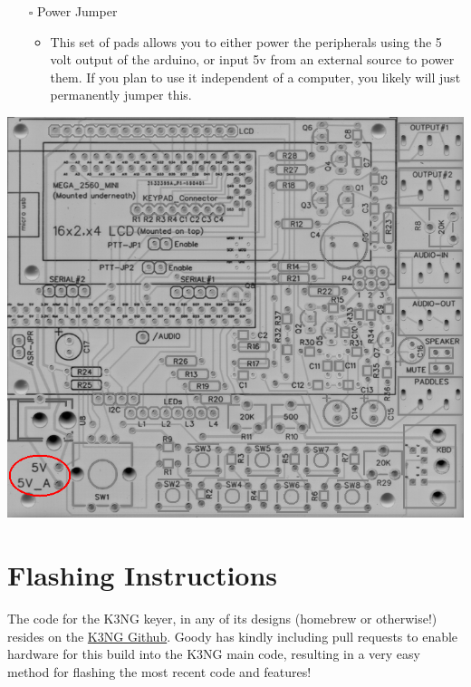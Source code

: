 \documentclass[11pt]{article}
\begin{document}
\newpage
\begin{itemize}
\item[{$\square$}] Power Jumper

\begin{itemize}
\item This set of pads allows you to either power the peripherals using the 5 volt output of the arduino, or input 5v from an external source to power them.  If you plan to use it independent of a computer, you likely will just permanently jumper this.
\end{itemize}
\end{itemize}
\begin{center}
\includegraphics[width=.9\linewidth]{../png/3.5/pcb-top-power-jumper.png}
\end{center}

\newpage
\section{Flashing Instructions}
\label{sec:org0f642e6}
The code for the K3NG keyer, in any of its designs (homebrew or otherwise!) resides on the \href{https://github.com/k3ng/k3ng\_cw\_keyer}{K3NG Github}.  Goody has kindly including pull requests to enable hardware for this build into the K3NG main code, resulting in a very easy method for flashing the most recent code and features!
\end{document}
